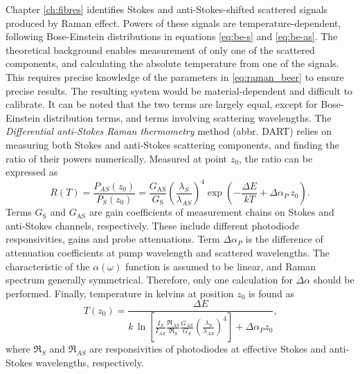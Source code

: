 \documentclass{standalone}
\begin{document}
Chapter \ref{ch:fibres} identifies Stokes and anti-Stokes-shifted scattered signals produced by Raman effect. Powers of these signals are temperature-dependent, following Bose-Einstein distributions in equations \ref{eq:be-s} and \ref{eq:be-as}. The theoretical background enables measurement of only one of the scattered components, and calculating the absolute temperature from one of the signals. This requires precise knowledge of the parameters in \ref{eq:raman_beer} to ensure precise results. The resulting system would be material-dependent and difficult to calibrate. It can be noted that the two terms are largely equal, except for Bose-Einstein distribution terms, and terms involving scattering wavelengths. The \textit{Differential anti-Stokes Raman thermometry} method (abbr. DART) relies on measuring both Stokes and anti-Stokes scattering components, and finding the ratio of their powers numerically. Measured at point $z_0$, the ratio can be expressed as
\begin{equation}
R(T) = \frac{P_{AS}(z_0)}{P_S(z_0)} = \frac{G_\textrm{AS}}{G_\textrm{S}} \left( \frac{\lambda_S}{\lambda_{AS}} \right)^4 \exp\left( - \frac{\varDelta E}{k T} + \varDelta \alpha_P \, z_0 \right) \textrm{.}
\end{equation}
Terms $G_\textrm{S}$ and $G_\textrm{AS}$ are gain coefficients of measurement chains on Stokes and anti-Stokes channels, respectively. These include different photodiode responsivities, gains and probe attenuations. Term $\varDelta \alpha_P$ is the difference of attenuation coefficients at pump wavelength and scattered wavelengths. The characteristic of the $\alpha(\omega)$ function is assumed to be linear, and Raman spectrum generally symmetrical. Therefore, only one calculation for $\varDelta \alpha$ should be performed. Finally, temperature in kelvins at position $z_0$ is found as
\begin{equation} \label{eq:stokes_temperature}
T(z_0) = \frac{\varDelta E}{k \, \ln \left[ \frac{I_S}{I_{AS}} \frac{\Re_{AS}}{\Re_S} \frac{G_{AS}}{G_S} \left(\frac{\lambda_S}{\lambda_{AS}}\right)^4 \right] + \varDelta \alpha_P z_0 } \textrm{,}
\end{equation}
where $\Re_S$ and $\Re_{AS}$ are responsivities of photodiodes at effective Stokes and anti-Stokes wavelengths, respectively.



\setcounter{stranica}{\thepage}
\addtocounter{stranica}{1}
\end{document}
